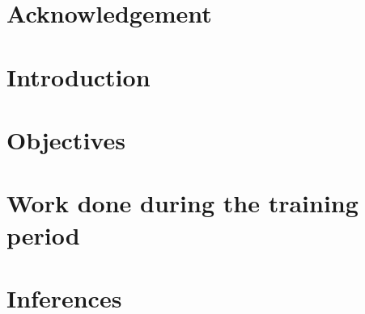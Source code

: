 \documentclass[12pt, a4paper, twoside]{report}
\title{\reporttitle}
\begin{document}
    
    \tableofcontents

    \chapter{Acknowledgement}
    

    \chapter{Introduction}
    

    \chapter{Objectives}
    

    \chapter{Work done during the training period}
    

    \chapter{Inferences}
    

    
    
\end{document}
